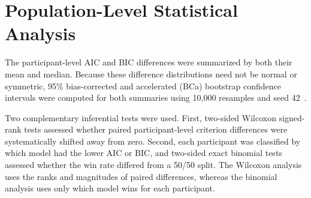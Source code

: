 \section{Population-Level Statistical Analysis}

The participant-level AIC and BIC differences were summarized by both their mean and median. Because these difference distributions need not be normal or symmetric, 95\% bias-corrected and accelerated (BCa) bootstrap confidence intervals were computed for both summaries using 10,000 resamples and seed 42~\cite{efron1987}.

Two complementary inferential tests were used. First, two-sided Wilcoxon signed-rank tests assessed whether paired participant-level criterion differences were systematically shifted away from zero. Second, each participant was classified by which model had the lower AIC or BIC, and two-sided exact binomial tests assessed whether the \PVL{} win rate differed from a 50/50 split. The Wilcoxon analysis uses the ranks and magnitudes of paired differences, whereas the binomial analysis uses only which model wins for each participant.
